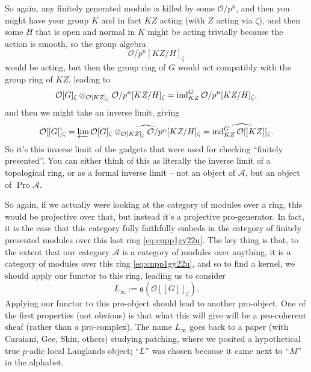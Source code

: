 \documentclass[reqno]{amsart} 
\begin{document}
So again, any finitely generated module is killed by some $\mathcal{O} / p^n$, and then you might have your group $K$ and in fact $K Z$ acting (with $Z$ acting via $\zeta$), and then some $H$ that is open and normal in $K$ might be acting trivially because the action is smooth, so the group algebra
\begin{equation*}
  \mathcal{O} / p^n[K Z / H]_\zeta 
\end{equation*}
would be acting, but then the group ring of $G$ would act compatibly with the group ring of $K Z$, leading to
\begin{equation*}
  \mathcal{O}[G]_\zeta  \otimes_{  \mathcal{O}[K Z]_\zeta }  \mathcal{O} / p^n[K Z / H]_\zeta
  = \operatorname{ind}_{K Z}^G \mathcal{O} / p^n[K Z / H]_\zeta,
\end{equation*}
and then we might take an inverse limit, giving
\begin{equation}\label{eq:cnpp1gy22u}
  \mathcal{O}[[G]]_\zeta
  =
  \varprojlim 
  \widehat{\mathcal{O}[G]_\zeta  \otimes_{  \mathcal{O}[K Z]_\zeta }  \mathcal{O} / p^n[K Z / H]_\zeta }
  = \widehat{\operatorname{ind}_{K Z}^G \mathcal{O}[[K Z]]_\zeta}.
\end{equation}
So it's this inverse limit of the gadgets that were used for checking ``finitely presented''.  You can either think of this as literally the inverse limit of a topological ring, or as a formal inverse limit -- not an object of $\mathcal{A}$, but an object of $\operatorname{Pro} \mathcal{A}$.

So again, if we actually were looking at the category of modules over a ring, this would be projective over that, but instead it's a projective pro-generator.  In fact, it is the case that this category fully faithfully embeds in the category of finitely presented modules over this last ring \eqref{eq:cnpp1gy22u}.  The key thing is that, to the extent that our category $\mathcal{A}$ is a category of modules over anything, it is a category of modules over this ring \eqref{eq:cnpp1gy22u}, and so to find a kernel, we should apply our functor to this ring, leading us to consider
\begin{equation*}
  L_\infty := \mathfrak{a} \left( \mathcal{O}[[G]]_\zeta \right).
\end{equation*}
Applying our functor to this pro-object should lead to another pro-object.  One of the first properties (not obvious) is that what this will give will be a pro-coherent sheaf (rather than a pro-complex).  The name $L_\infty$ goes back to a paper (with Caraiani, Gee, Shin, others) studying patching, where we posited a hypothetical true $p$-adic local Langlands object; ``$L$'' was chosen because it came next to ``$M$'' in the alphabet.
\end{document}

